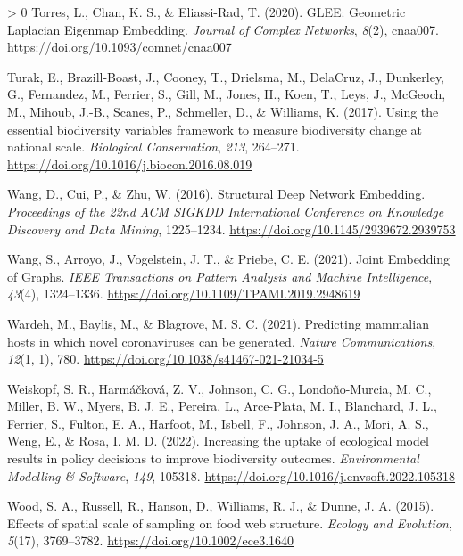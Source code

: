 \documentclass[10pt,oneside]{article}
\newlength{\cslhangindent}
\newenvironment{CSLReferences}[3] %
 {%
  \setlength{\parindent}{0pt}
  \ifodd #1 \everypar{\setlength{\hangindent}{\cslhangindent}}\ignorespaces\fi
  \ifnum #2 > 0
  \setlength{\parskip}{#2\baselineskip}
  \fi
 }%
 {}
\begin{document}
\begin{CSLReferences}{1}{0}
\leavevmode\hypertarget{ref-Torres2020GleGeo}{}%
Torres, L., Chan, K. S., \& Eliassi-Rad, T. (2020). GLEE: Geometric
Laplacian Eigenmap Embedding. \emph{Journal of Complex Networks},
\emph{8}(2), cnaa007. \url{https://doi.org/10.1093/comnet/cnaa007}

\leavevmode\hypertarget{ref-Turak2017UsiEss}{}%
Turak, E., Brazill-Boast, J., Cooney, T., Drielsma, M., DelaCruz, J.,
Dunkerley, G., Fernandez, M., Ferrier, S., Gill, M., Jones, H., Koen,
T., Leys, J., McGeoch, M., Mihoub, J.-B., Scanes, P., Schmeller, D., \&
Williams, K. (2017). Using the essential biodiversity variables
framework to measure biodiversity change at national scale.
\emph{Biological Conservation}, \emph{213}, 264--271.
\url{https://doi.org/10.1016/j.biocon.2016.08.019}

\leavevmode\hypertarget{ref-Wang2016StrDee}{}%
Wang, D., Cui, P., \& Zhu, W. (2016). Structural Deep Network Embedding.
\emph{Proceedings of the 22nd ACM SIGKDD International Conference on
Knowledge Discovery and Data Mining}, 1225--1234.
\url{https://doi.org/10.1145/2939672.2939753}

\leavevmode\hypertarget{ref-Wang2021JoiEmb}{}%
Wang, S., Arroyo, J., Vogelstein, J. T., \& Priebe, C. E. (2021). Joint
Embedding of Graphs. \emph{IEEE Transactions on Pattern Analysis and
Machine Intelligence}, \emph{43}(4), 1324--1336.
\url{https://doi.org/10.1109/TPAMI.2019.2948619}

\leavevmode\hypertarget{ref-Wardeh2021PreMam}{}%
Wardeh, M., Baylis, M., \& Blagrove, M. S. C. (2021). Predicting
mammalian hosts in which novel coronaviruses can be generated.
\emph{Nature Communications}, \emph{12}(1, 1), 780.
\url{https://doi.org/10.1038/s41467-021-21034-5}

\leavevmode\hypertarget{ref-Weiskopf2022IncUpt}{}%
Weiskopf, S. R., Harmáčková, Z. V., Johnson, C. G., Londoño-Murcia, M.
C., Miller, B. W., Myers, B. J. E., Pereira, L., Arce-Plata, M. I.,
Blanchard, J. L., Ferrier, S., Fulton, E. A., Harfoot, M., Isbell, F.,
Johnson, J. A., Mori, A. S., Weng, E., \& Rosa, I. M. D. (2022).
Increasing the uptake of ecological model results in policy decisions to
improve biodiversity outcomes. \emph{Environmental Modelling \&
Software}, \emph{149}, 105318.
\url{https://doi.org/10.1016/j.envsoft.2022.105318}

\leavevmode\hypertarget{ref-Wood2015EffSpa}{}%
Wood, S. A., Russell, R., Hanson, D., Williams, R. J., \& Dunne, J. A.
(2015). Effects of spatial scale of sampling on food web structure.
\emph{Ecology and Evolution}, \emph{5}(17), 3769--3782.
\url{https://doi.org/10.1002/ece3.1640}


\end{CSLReferences}
\end{document}
